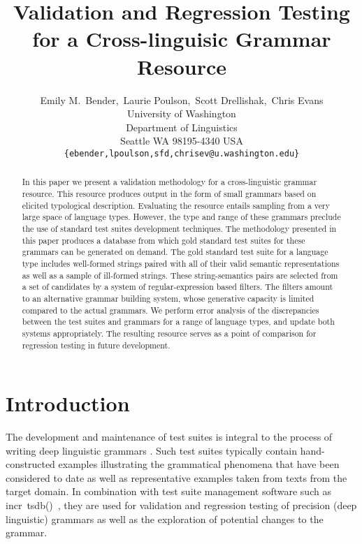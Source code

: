 \documentclass[11pt]{article}
\title{Validation and Regression Testing for a Cross-linguisic Grammar Resource}
\author{Emily M.~Bender,\  Laurie Poulson,\  Scott Drellishak,\ Chris Evans\\
University of Washington\\
Department of Linguistics\\
Seattle WA 98195-4340 USA\\
{\tt \{ebender,lpoulson,sfd,chrisev@u.washington.edu\}}}
\date{}
\newcommand{\itsdb}{\mbox{\sf \lbrack incr tsdb()\rbrack}}
\begin{document}
\maketitle
\begin{abstract}

In this paper we present a validation methodology for a
  cross-linguistic grammar resource.  This resource produces output in
  the form of small grammars based on elicited typological
  description.  Evaluating the resource entails sampling from a very
  large space of language types. However, the type and range of these
  grammars preclude the use of standard test suites development
  techniques.  The methodology presented in this paper produces a
  database from which gold standard test suites for these grammars can
  be generated on demand.  The gold standard test suite for a language
  type includes well-formed strings paired with all of their valid
  semantic representations as well as a sample of ill-formed strings.
  These string-semantics pairs are selected from a set of candidates
  by a system of regular-expression based filters.  The filters amount
  to an alternative grammar building system, whose generative capacity
  is limited compared to the actual grammars.  We perform error
  analysis of the discrepancies between the test suites and grammars
  for a range of language types, and update both systems
  appropriately.  The resulting resource serves as a point of
  comparison for regression testing in future development.

\end{abstract}


\section{Introduction}

The development and maintenance of test suites is integral to the
process of writing deep linguistic grammars
\cite{Oep:Fli:98,But:Kin:03}.  Such test suites typically contain
hand-constructed examples illustrating the grammatical phenomena that
have been considered to date as well as representative examples taken
from texts from the target domain.  In combination with test suite
management software such as \itsdb\ \cite{Oepen:01}, they are used for
validation and regression testing of precision (deep linguistic) grammars as well as the
exploration of potential changes to the grammar.  
\end{document}
